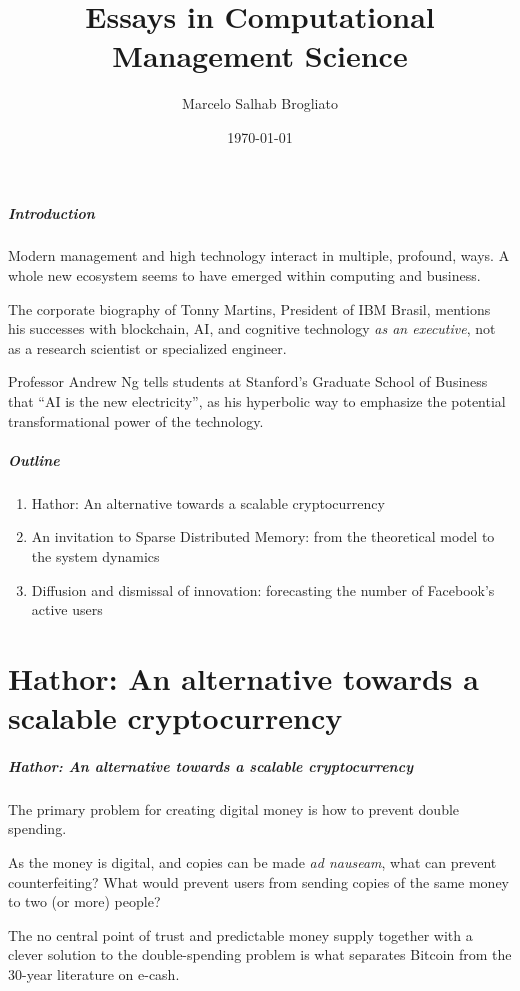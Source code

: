 \documentclass{beamer}
\title{Essays in Computational Management Science}
\author{Marcelo Salhab Brogliato}
\institute{EBAPE / FGV}
\date{\today}
\begin{document}
\begin{frame}
\titlepage
\end{frame}


\begin{frame}
\frametitle{Introduction}

Modern management and high technology interact in multiple, profound, ways. A whole new ecosystem seems to have emerged within computing and business.

The corporate biography of Tonny Martins, President of IBM Brasil, mentions his successes with blockchain, AI, and cognitive technology \emph{as an executive}, not as a research scientist or specialized engineer.

Professor Andrew Ng tells students at Stanford's Graduate School of Business that ``AI is the new electricity'', as his hyperbolic way to emphasize the potential transformational power of the technology.
\end{frame}


\begin{frame}
\frametitle{Outline}
\begin{enumerate}[I]
\item Hathor: An alternative towards a scalable cryptocurrency
\item An invitation to Sparse Distributed Memory: from the theoretical model to the system dynamics
\item Diffusion and dismissal of innovation: forecasting the number of Facebook’s active users
\end{enumerate}
\end{frame}


\part{Hathor: An alternative towards a scalable cryptocurrency}
\begin{frame}
\frametitle{Hathor: An alternative towards a scalable cryptocurrency}

The primary problem for creating digital money is how to prevent double spending.

As the money is digital, and copies can be made \emph{ad nauseam}, what can prevent counterfeiting? What would prevent users from sending copies of the same money to two (or more) people?

The no central point of trust and predictable money supply together with a clever solution to the double-spending problem is what separates Bitcoin from the 30-year literature on e-cash.

\end{frame}
\end{document}
